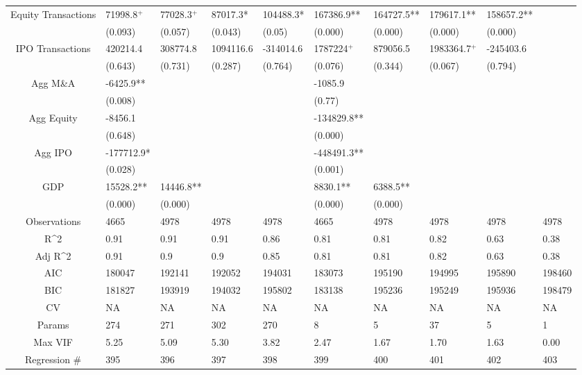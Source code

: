 \documentclass{article}
\begin{document}
\begin{table}[H]
\begin{tabular}{|clllllllll|}
  Equity Transactions & 71998.8$^{+}$ & 77028.3$^{+}$ & 87017.3* & 104488.3* & 167386.9** & 164727.5** & 179617.1** & 158657.2** &  \\ 
   & (0.093) & (0.057) & (0.043) & (0.05) & (0.000) & (0.000) & (0.000) & (0.000) &  \\ 
  IPO Transactions & 420214.4 & 308774.8 & 1094116.6 & -314014.6 & 1787224$^{+}$ & 879056.5 & 1983364.7$^{+}$ & -245403.6 &  \\ 
   & (0.643) & (0.731) & (0.287) & (0.764) & (0.076) & (0.344) & (0.067) & (0.794) &  \\ 
  Agg M\&A & -6425.9** &  &  &  & -1085.9 &  &  &  &  \\ 
   & (0.008) &  &  &  & (0.77) &  &  &  &  \\ 
  Agg Equity & -8456.1 &  &  &  & -134829.8** &  &  &  &  \\ 
   & (0.648) &  &  &  & (0.000) &  &  &  &  \\ 
  Agg IPO & -177712.9* &  &  &  & -448491.3** &  &  &  &  \\ 
   & (0.028) &  &  &  & (0.001) &  &  &  &  \\ 
  GDP & 15528.2** & 14446.8** &  &  & 8830.1** & 6388.5** &  &  &  \\ 
   & (0.000) & (0.000) &  &  & (0.000) & (0.000) &  &  &  \\ 
  \hline 
 Observations & 4665 & 4978 & 4978 & 4978 & 4665 & 4978 & 4978 & 4978 & 4978 \\ 
  R^2 & 0.91 & 0.91 & 0.91 & 0.86 & 0.81 & 0.81 & 0.82 & 0.63 & 0.38 \\ 
  Adj R^2 & 0.91 & 0.9 & 0.9 & 0.85 & 0.81 & 0.81 & 0.82 & 0.63 & 0.38 \\ 
  AIC & 180047 & 192141 & 192052 & 194031 & 183073 & 195190 & 194995 & 195890 & 198460 \\ 
  BIC & 181827 & 193919 & 194032 & 195802 & 183138 & 195236 & 195249 & 195936 & 198479 \\ 
  CV & NA & NA & NA & NA & NA & NA & NA & NA & NA \\ 
  Params & 274 & 271 & 302 & 270 & 8 & 5 & 37 & 5 & 1 \\ 
  Max VIF & 5.25 & 5.09 & 5.30 & 3.82 & 2.47 & 1.67 & 1.70 & 1.63 & 0.00 \\ 
  Regression \# & 395 & 396 & 397 & 398 & 399 & 400 & 401 & 402 & 403 \\ 
   \hline
\end{tabular}
 
\end{table}
\end{document}
